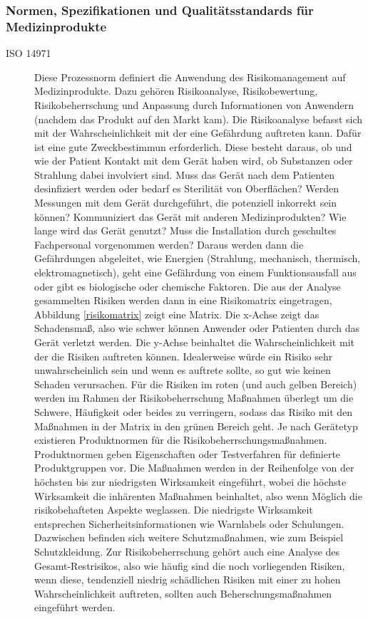 \documentclass[a4paper, 12pt]{article}
\begin{document}
\subsubsection{Normen, Spezifikationen und Qualitätsstandards für Medizinprodukte}\label{mdr_norms}
\begin{description}

	\item[ISO 14971] \label{iso14971}
	Diese Prozessnorm definiert die Anwendung des Risikomanagement auf Medizinprodukte. Dazu gehören Risikoanalyse, Risikobewertung, Risikobeherrschung und Anpassung durch Informationen von Anwendern (nachdem das Produkt auf den Markt kam).
	Die Risikoanalyse befasst sich mit der Wahrscheinlichkeit mit der eine Gefährdung auftreten kann. Dafür ist eine gute Zweckbestimmun erforderlich. Diese besteht daraus, ob und wie der Patient Kontakt mit dem Gerät haben wird, ob Substanzen oder Strahlung dabei involviert sind. Muss das Gerät nach dem Patienten desinfiziert werden oder bedarf es Sterilität von Oberflächen? Werden Messungen mit dem Gerät durchgeführt, die potenziell inkorrekt sein können? Kommuniziert das Gerät mit anderen Medizinprodukten? Wie lange wird das Gerät genutzt? Muss die Installation durch geschultes Fachpersonal vorgenommen werden?
	Daraus werden dann die Gefährdungen abgeleitet, wie Energien (Strahlung, mechanisch, thermisch, elektromagnetisch), geht eine Gefährdung von einem Funktionsausfall aus oder gibt es biologische oder chemische Faktoren.
	Die aus der Analyse gesammelten Risiken werden dann in eine Risikomatrix eingetragen, Abbildung \ref{risikomatrix} zeigt eine Matrix. Die x-Achse zeigt das Schadensmaß, also wie schwer können Anwender oder Patienten durch das Gerät verletzt werden. Die y-Achse beinhaltet die Wahrscheinlichkeit mit der die Risiken auftreten können. Idealerweise würde ein Risiko sehr unwahrscheinlich sein und wenn es auftrete sollte, so gut wie keinen Schaden verursachen. 
	Für die Risiken im roten (und auch gelben Bereich) werden im Rahmen der  Risikobeherrschung Maßnahmen überlegt um die Schwere, Häufigkeit oder beides zu verringern, sodass das Risiko mit den Maßnahmen in der Matrix in den grünen Bereich geht. Je nach Gerätetyp existieren Produktnormen für die Risikobeherrschungsmaßnahmen. Produktnormen geben Eigenschaften oder Testverfahren für definierte Produktgruppen vor. Die Maßnahmen werden in der Reihenfolge von der höchsten bis zur niedrigsten Wirksamkeit eingeführt, wobei die höchste Wirksamkeit die inhärenten Maßnahmen beinhaltet, also wenn Möglich die risikobehafteten Aspekte weglassen. Die niedrigste Wirksamkeit entsprechen Sicherheitsinformationen wie Warnlabels oder Schulungen. Dazwischen befinden sich weitere Schutzmaßnahmen, wie zum Beispiel Schutzkleidung. Zur Risikobeherrschung gehört auch eine Analyse des Gesamt-Restrisikos, also wie häufig sind die noch vorliegenden Risiken, wenn diese, tendenziell niedrig schädlichen Risiken mit einer zu hohen Wahrscheinlichkeit auftreten, sollten auch Beherschungsmaßnahmen eingeführt werden.

\end{description}
\end{document}
